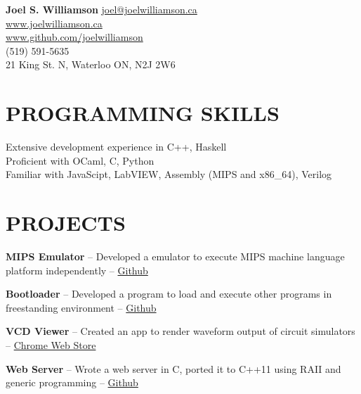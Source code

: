 \documentclass{res}
\begin{document}
 

\begin{center}
{\Large\bf Joel S. Williamson}
{\center \href{mailto:joel@joelwilliamson.ca}{joel@joelwilliamson.ca}\\\url{www.joelwilliamson.ca}\\\url{www.github.com/joelwilliamson}\\
(519) 591-5635\\21 King St. N, Waterloo ON, N2J 2W6 }
\end{center}
\vspace{-1cm}                 
\begin{resume}

\section{PROGRAMMING SKILLS}          
  \vspace{3mm}
    Extensive development experience in C++, Haskell\\
    Proficient with OCaml, C, Python\\
    Familiar with JavaScipt, LabVIEW, Assembly (MIPS and x86\_64), Verilog
 

\section{PROJECTS}
  \vspace{3mm}
    {\bf MIPS Emulator} -- Developed a emulator to execute MIPS machine language platform independently --
    \href{https://github.com/joelwilliamson/MIPS-emulator}{Github}
    \vspace{-3mm}
    
    {\bf Bootloader} -- Developed a program to load and execute other programs in freestanding environment --
    \href{https://github.com/joelwilliamson/AMD64/tree/master/barebones}{Github}
    \vspace{-3mm}
    
    {\bf VCD Viewer} -- Created an app to render waveform output of circuit simulators --
    \href{https://chrome.google.com/webstore/detail/vcd-viewer/fpacodjpmmabkjooobgbpgpmgbfjidkg?hl=en-US}{Chrome Web Store}
    \vspace{-3mm}
    
    {\bf Web Server} -- Wrote a web server in C, ported it to C++11 using RAII and generic programming --
    \href{https://www.github.com/joelwilliamson/JServer}{Github}
    \vspace{-3mm}


\end{resume}
\end{document}

